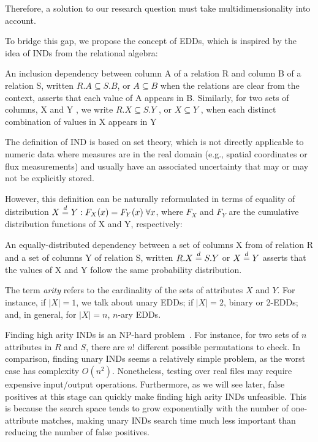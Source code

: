 Therefore, a solution to our research question must take multidimensionality into account.

To bridge this gap, we propose the concept of \glspl{EDD}, which is inspired by the idea of
\glspl{IND} from the relational algebra:

\begin{displayquote}
An inclusion dependency between column A of a relation
R and column B of a relation S, written $R.A \subseteq S.B$, or $A \subseteq B$
when the relations are clear from the context, asserts that each
value of A appears in B. Similarly, for two sets of columns, X
and Y , we write $R.X \subseteq S.Y$ , or $X \subseteq Y$ , when each distinct
combination of values in X appears in Y \cite{abedjan2015}
\end{displayquote}

The definition of \gls{IND} is based on set theory, which is not directly applicable to
numeric data where measures are in the real domain (e.g., spatial coordinates
or flux measurements) and usually
have an associated uncertainty that may or may not be explicitly stored.

However, this definition can be naturally reformulated in terms of
equality of distribution $X \stackrel{d}{=} Y: F_X(x) = F_Y(x) \; \forall x$, where $F_X$ and
$F_Y$ are the cumulative distribution functions of X and Y, respectively:

\begin{definition}
An equally-distributed dependency between a set of columns X from
of relation R and a set of columns Y of relation S, written $R.X \stackrel{d}{=} S.Y$ or
$X \stackrel{d}{=} Y$ asserts that the values of X and Y follow the same probability distribution.
\label{def:eqdist}
\end{definition}

The term \emph{arity} refers to the cardinality of the sets of attributes $X$ and $Y$. For instance, if $|X| = 1$, we talk about unary \glspl{EDD}; if $|X| = 2$,
binary or 2-\glspl{EDD}; and, in general, for $|X| = n$, $n$-ary \glspl{EDD}.

Finding high arity \glspl{IND} is an NP-hard problem~\cite{kantola1992}.
For instance, for two sets of $n$ attributes in $R$ and $S$,
there are $n!$ different possible permutations to check.
In comparison, finding unary \glspl{IND} seems a relatively simple problem,
as the worst case has complexity $O(n^2)$. Nonetheless,
testing over real files may require expensive input/output operations.
Furthermore, as we will see later, false positives at this stage can quickly make
finding high arity \glspl{IND} unfeasible. This is because the search space tends to grow exponentially
with the number of one-attribute matches, making unary \glspl{IND} search time much less important
than reducing the number of false positives.

